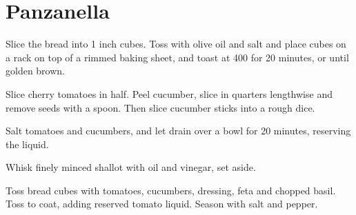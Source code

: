 \section{Panzanella}
\begin{recipe}



Slice the bread into 1 inch cubes. Toss with olive oil and salt and place cubes on a rack on top of a rimmed baking sheet, and toast at 400\degree{} for 20 minutes, or until golden brown.


Slice cherry tomatoes in half. Peel cucumber, slice in quarters lengthwise and remove seeds with a spoon. Then slice cucumber sticks into a rough dice.

Salt tomatoes and cucumbers, and let drain over a bowl for 20 minutes, reserving the liquid.


Whisk finely minced shallot with oil and vinegar, set aside.


Toss bread cubes with tomatoes, cucumbers, dressing, feta and chopped basil. Toss to coat, adding reserved tomato liquid. Season with salt and pepper.

\end{recipe}
